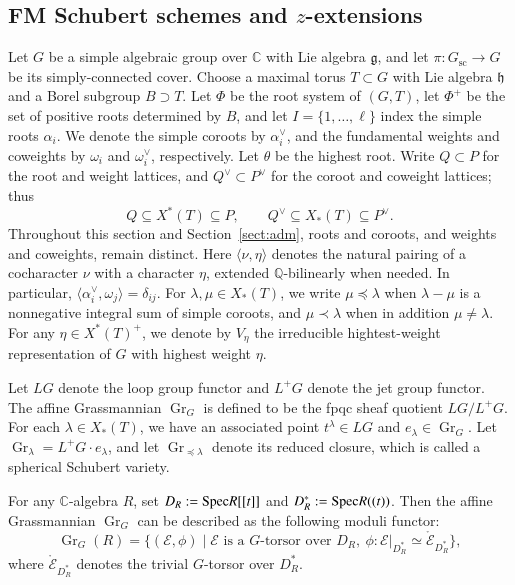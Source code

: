 \documentclass[a4paper, 12pt]{amsart}
\theoremstyle{definition}
\newcommand{\C}{\mathbb C}
\newcommand{\g}{\mathfrak g}
\newcommand{\fh}{\mathfrak{h}}
\DeclareMathOperator{\Gr}{\mathrm{Gr}}
\begin{document}
\label{sec:fmtest}
\subsection{FM Schubert schemes  and $z$-extensions}
\label{subsec:fm-zextension}

Let $G$ be a  simple algebraic group over $\C$ with
Lie algebra $\g$, and let
$\pi:G_{\mathrm{sc}}\to G$ be its simply-connected cover.
Choose a maximal torus $T\subset G$ with Lie algebra
$\fh$ and a Borel subgroup $B\supset T$.
Let $\Phi$ be the root system of $(G,T)$, let $\Phi^+$ be the set of
positive roots determined by $B$, and let $I=\{1,\ldots,\ell\}$ index
the simple roots $\alpha_i$. We denote the simple coroots by
$\alpha_i^\vee$, and the fundamental weights and coweights by
$\omega_i$ and $\omega_i^\vee$, respectively. Let $\theta$ be the
highest root. Write $Q\subset P$ for the root and weight lattices, and
$Q^\vee\subset P^\vee$ for the coroot and coweight lattices; thus
\[
Q\subseteq X^*(T)\subseteq P,\qquad
Q^\vee\subseteq X_*(T)\subseteq P^\vee.
\]
Throughout this section and Section~\ref{sect:adm}, roots and coroots,
and weights and coweights, remain distinct.
Here $\langle\nu,\eta\rangle$ denotes the natural pairing of a
cocharacter $\nu$ with a character $\eta$, extended $\mathbb Q$-bilinearly
when needed. In particular, $\langle\alpha_i^\vee,\omega_j\rangle=\delta_{ij}$.
For $\lambda,\mu\in X_*(T)$, we write $\mu\preceq\lambda$ when
$\lambda-\mu$ is a nonnegative integral sum of simple coroots, and
$\mu\prec\lambda$ when in addition $\mu\neq\lambda$. For any $\eta\in X^*(T)^+$, we denote by $V_\eta$ the irreducible hightest-weight representation of $G$ with highest weight $\eta$.	

Let $LG$ denote the loop group functor and $L^+G$ denote the jet group functor.
The affine Grassmannian $\Gr_G$ is defined to be the fpqc sheaf quotient
$LG/L^+G$. For each $\lambda\in X_*(T)$, we have an associated point
$t^\lambda\in LG$ and $e_\lambda\in\Gr_G$.
Let $\Gr_{\lambda}=L^+G\cdot e_\lambda$, and let
$\Gr_{\preceq\lambda}$ denote its reduced closure, which is called a
spherical Schubert variety.

For any $\C$-algebra $R$, set
$D_R:={\rm Spec}R[[t]]$ and $D_R^*:={\rm Spec}R((t))$.
Then the affine Grassmannian $\Gr_G$ can be described as the following moduli functor:
\[
\Gr_G(R)=\{(\mathscr E,\phi)\mid \mathscr E\text{ is a }G\text{-torsor over }D_R,
\ \phi:\mathscr E|_{D_R^*}\simeq\mathring{\mathscr E}_{D_R^*}\},
\]
where $\mathring{\mathscr E}_{D_R^*}$ denotes the trivial $G$-torsor over $D_R^*$.
\end{document}

